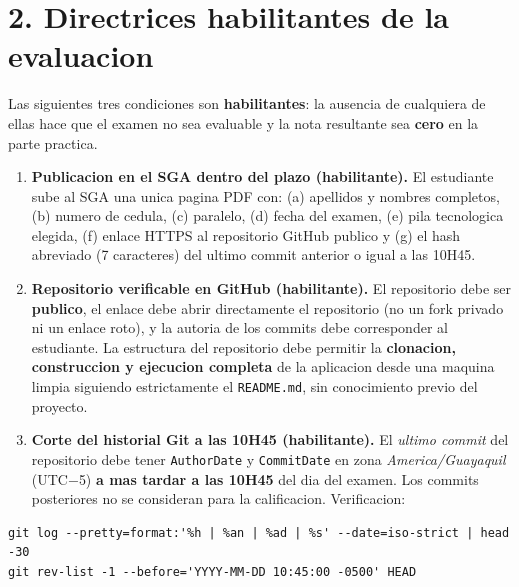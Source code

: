 \documentclass[10pt,a4paper]{article}
\begin{document}
\section*{2. Directrices habilitantes de la evaluacion}
Las siguientes tres condiciones son \textbf{habilitantes}: la ausencia de cualquiera de ellas hace que el examen no sea evaluable y la nota resultante sea \textbf{cero} en la parte practica.
\begin{enumerate}[leftmargin=1.4em,itemsep=1pt,topsep=2pt]
    \item \textbf{Publicacion en el SGA dentro del plazo (habilitante).} El estudiante sube al SGA una unica pagina PDF con: (a) apellidos y nombres completos, (b) numero de cedula, (c) paralelo, (d) fecha del examen, (e) pila tecnologica elegida, (f) enlace HTTPS al repositorio GitHub publico y (g) el hash abreviado (7 caracteres) del ultimo commit anterior o igual a las 10H45.
    \item \textbf{Repositorio verificable en GitHub (habilitante).} El repositorio debe ser \textbf{publico}, el enlace debe abrir directamente el repositorio (no un fork privado ni un enlace roto), y la autoria de los commits debe corresponder al estudiante. La estructura del repositorio debe permitir la \textbf{clonacion, construccion y ejecucion completa} de la aplicacion desde una maquina limpia siguiendo estrictamente el \texttt{README.md}, sin conocimiento previo del proyecto.
    \item \textbf{Corte del historial Git a las 10H45 (habilitante).} El \emph{ultimo commit} del repositorio debe tener \texttt{AuthorDate} y \texttt{CommitDate} en zona \emph{America/Guayaquil} (UTC$-$5) \textbf{a mas tardar a las 10H45} del dia del examen. Los commits posteriores no se consideran para la calificacion. Verificacion:
\end{enumerate}
\begin{lstlisting}[style=shellestilo]
git log --pretty=format:'%h | %an | %ad | %s' --date=iso-strict | head -30
git rev-list -1 --before='YYYY-MM-DD 10:45:00 -0500' HEAD
\end{lstlisting}

\end{document}
